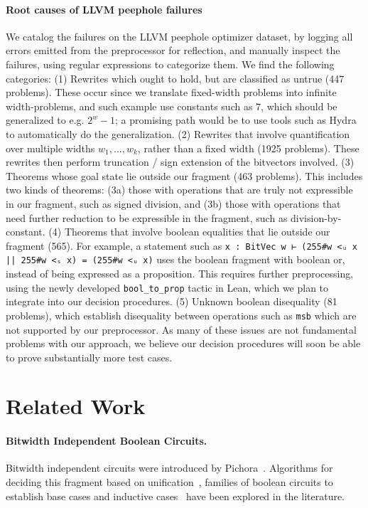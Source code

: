 \paragraph{Root causes of LLVM peephole failures}
We catalog the failures on the LLVM peephole optimizer dataset,
by logging all errors emitted from the preprocessor for reflection,
and manually inspect the failures, using regular expressions to categorize them.
We find the following categories: (1) Rewrites which ought to hold, but are classified as untrue (447 problems).
These occur since we translate fixed-width problems into infinite width-problems, and such example use constants such as $7$,
which should be generalized to e.g. $2^w - 1$; a promising path would be to use
tools such as Hydra~\citep{mukherjee2024hydra} to automatically do the
generalization.
(2) Rewrites that involve quantification over multiple widths $w_1, \dots, w_k$, rather than a fixed width (1925 problems).
These rewrites then perform truncation / sign extension of the bitvectors involved.
(3) Theorems whose goal state lie outside our fragment (463 problems). This includes two kinds of theorems:
(3a) those with operations that are truly not expressible in our fragment, such as signed division,
and (3b) those with operations that need further reduction to be expressible in the fragment, such as division-by-constant.
(4) Theorems that involve boolean equalities that lie outside our fragment (565).
For example, a statement such as \texttt{x : BitVec w ⊢ (255\#w <ᵤ x || 255\#w <ₛ x) = (255\#w <ᵤ x)} uses the
boolean fragment with boolean or, instead of being expressed as a proposition.
This requires further preprocessing, using the newly developed \texttt{bool\_to\_prop} tactic in Lean,
which we plan to integrate into our decision procedures.
(5) Unknown boolean disequality (81 problems), which establish disequality between operations such as \texttt{msb}
which are not supported by our preprocessor.
%
As many of these issues are not fundamental problems with our approach, we
believe our decision procedures will soon be able to prove substantially more
test cases.

\section{Related Work}
\label{sec:swbv:related}

\paragraph{Bitwidth Independent Boolean Circuits.}
Bitwidth independent circuits were introduced by Pichora~\cite{pichora2003automated}.
Algorithms for deciding this fragment based on unification~\cite{bjorner1998deciding},
families of boolean circuits to establish base cases and inductive cases~\citep{gupta1993parametric,gupta1993representation}
have been explored in the literature.

